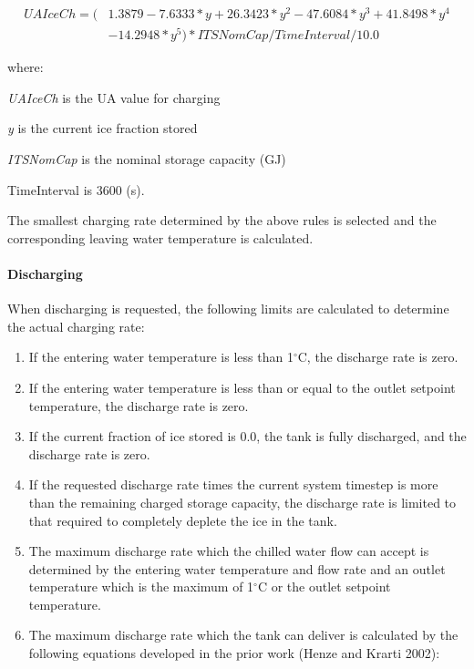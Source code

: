 \begin{equation}
\begin{split}
{UAIceCh} = (& 1.3879 - 7.6333*{y} + 26.3423*{y^2} - 47.6084*{y^3} + 41.8498*{y^4} \\
&- 14.2948*{y^5} ) * {ITSNomCap} / {TimeInterval} / 10.0
\end{split}
\end{equation}

where:

\emph{UAIceCh} is the UA value for charging

\emph{y} is the current ice fraction stored

\emph{ITSNomCap} is the nominal storage capacity (GJ)

TimeInterval is 3600 (s).

The smallest charging rate determined by the above rules is selected and the corresponding leaving water temperature is calculated.

\paragraph{Discharging}\label{discharging}

When discharging is requested, the following limits are calculated to determine the actual charging rate:

\begin{enumerate}
\item If the entering water temperature is less than 1\(^{\circ}\)C, the discharge rate is zero.
\item If the entering water temperature is less than or equal to the outlet setpoint temperature, the discharge rate is zero.
\item If the current fraction of ice stored is 0.0, the tank is fully discharged, and the discharge rate is zero.
\item If the requested discharge rate times the current system timestep is more than the remaining charged storage capacity, the discharge rate is limited to that required to completely deplete the ice in the tank.
\item The maximum discharge rate which the chilled water flow can accept is determined by the entering water temperature and flow rate and an outlet temperature which is the maximum of 1\(^{\circ}\)C or the outlet setpoint temperature.
\item The maximum discharge rate which the tank can deliver is calculated by the following equations developed in the prior work (Henze and Krarti 2002):
\end{enumerate}

